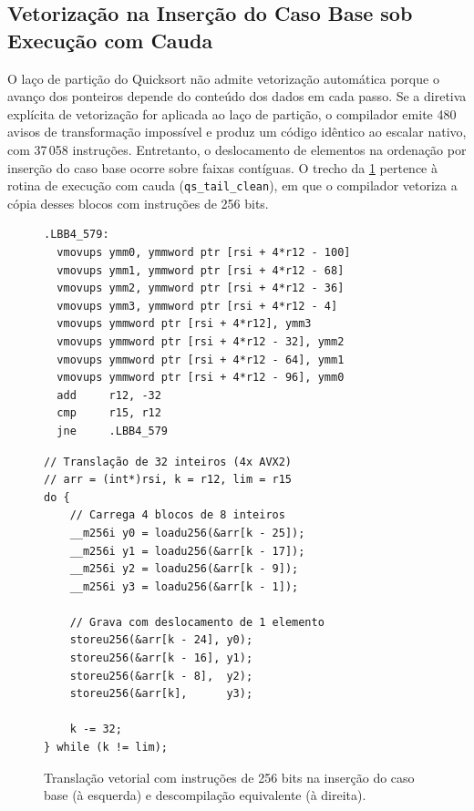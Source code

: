 \documentclass[12pt]{article}
\begin{document}
\subsection{Vetorização na Inserção do Caso Base sob Execução com Cauda}\label{sec:apendice-asm-vetorizacao}

O laço de partição do Quicksort não admite vetorização automática porque o avanço dos ponteiros depende do conteúdo dos dados em cada passo. Se a diretiva explícita de vetorização for aplicada ao laço de partição, o compilador emite 480 avisos de transformação impossível e produz um código idêntico ao escalar nativo, com 37\,058 instruções. Entretanto, o deslocamento de elementos na ordenação por inserção do caso base ocorre sobre faixas contíguas. O trecho da \cref{fig:asm-simd} pertence à rotina de execução com cauda (\texttt{qs\_tail\_clean}), em que o compilador vetoriza a cópia desses blocos com instruções de 256 bits.

\begin{figure}[htbp]
\centering
\begin{minipage}[t]{0.48\textwidth}
\begin{verbatim}
.LBB4_579:
  vmovups ymm0, ymmword ptr [rsi + 4*r12 - 100]
  vmovups ymm1, ymmword ptr [rsi + 4*r12 - 68]
  vmovups ymm2, ymmword ptr [rsi + 4*r12 - 36]
  vmovups ymm3, ymmword ptr [rsi + 4*r12 - 4]
  vmovups ymmword ptr [rsi + 4*r12], ymm3
  vmovups ymmword ptr [rsi + 4*r12 - 32], ymm2
  vmovups ymmword ptr [rsi + 4*r12 - 64], ymm1
  vmovups ymmword ptr [rsi + 4*r12 - 96], ymm0
  add     r12, -32
  cmp     r15, r12
  jne     .LBB4_579
\end{verbatim}
\end{minipage}\hfill
\begin{minipage}[t]{0.48\textwidth}
\begin{verbatim}
// Translação de 32 inteiros (4x AVX2)
// arr = (int*)rsi, k = r12, lim = r15
do {
    // Carrega 4 blocos de 8 inteiros
    __m256i y0 = loadu256(&arr[k - 25]);
    __m256i y1 = loadu256(&arr[k - 17]);
    __m256i y2 = loadu256(&arr[k - 9]);
    __m256i y3 = loadu256(&arr[k - 1]);

    // Grava com deslocamento de 1 elemento
    storeu256(&arr[k - 24], y0);
    storeu256(&arr[k - 16], y1);
    storeu256(&arr[k - 8],  y2);
    storeu256(&arr[k],      y3);

    k -= 32;
} while (k != lim);
\end{verbatim}
\end{minipage}
\caption{Translação vetorial com instruções de 256 bits na inserção do caso base (à esquerda) e descompilação equivalente (à direita).}
\label{fig:asm-simd}
\end{figure}
\end{document}
